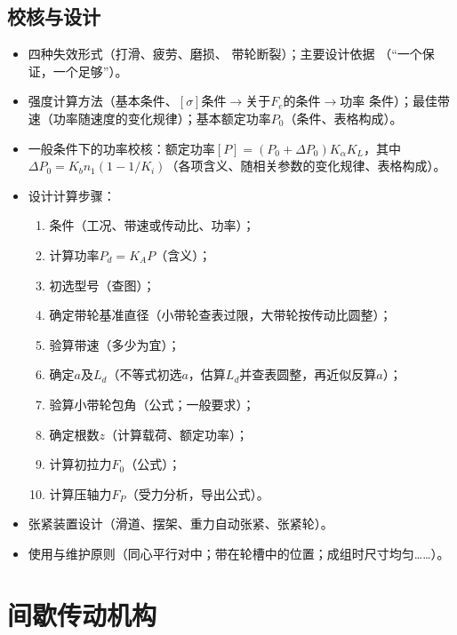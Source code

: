 \documentclass[12pt,a4paper]{article}
\newcommand{\tightlist}{\setlength{\parskip}{0pt}\setlength{\itemsep}{0pt}}
\newcommand{\hint}[1]{\textsf{（#1）}}
\newcommand{\minor}[1]{{\color{gray} #1}}
\newcommand{\then}{$\to$}
\begin{document}
\subsection{校核与设计}
\begin{itemize}\tightlist
    \item 四种失效形式\hint{打滑、疲劳、磨损、\minor{带轮断裂}}；主要设计依据
    \hint{“一个保证，一个足够”}。
    \item 强度计算方法\hint{基本条件、$[\sigma]$条件\then 关于$F_e$的条件\then 功率
    条件}；最佳带速\hint{功率随速度的变化规律}；基本额定功率$P_0$\hint{条件、表格构成}。
    \item 一般条件下的功率校核：额定功率$[P]=(P_0+\Delta P_0)K_\alpha K_L$，其中
    $\Delta P_0=K_bn_1(1-1/K_i)$\hint{各项含义、随相关参数的变化规律、表格构成}。
    \item 设计计算步骤：
    \begin{enumerate}\tightlist
        \item 条件\hint{工况、带速或传动比、功率}；
        \item 计算功率$P_d=K_AP$\hint{含义}；
        \item 初选型号\hint{查图}；
        \item 确定带轮基准直径\hint{小带轮查表过限，大带轮按传动比圆整}；
        \item 验算带速\hint{多少为宜}；
        \item 确定$a$及$L_d$\hint{不等式初选$a$，估算$L_d$并查表圆整，再近似反算$a$}；
        \item 验算小带轮包角\hint{公式；一般要求}；
        \item 确定根数$z$\hint{计算载荷、额定功率}；
        \item 计算初拉力$F_0$\hint{公式}；
        \item 计算压轴力$F_P$\hint{受力分析，导出公式}。
    \end{enumerate}
    \item \minor{张紧装置设计\hint{滑道、摆架、重力自动张紧、张紧轮}。}
    \item 使用与维护原则\hint{同心平行对中；带在轮槽中的位置；成组时尺寸均匀……}。
\end{itemize}

\section{间歇传动机构}
\end{document}
